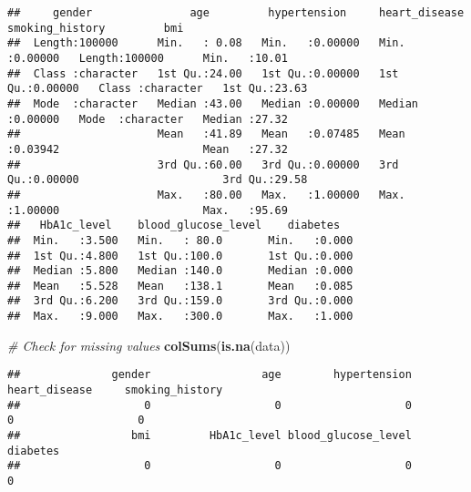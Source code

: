 \documentclass[
]{article}
\newenvironment{Shaded}{\begin{snugshade}}{\end{snugshade}}
\newcommand{\CommentTok}[1]{\textcolor[rgb]{0.56,0.35,0.01}{\textit{#1}}}
\newcommand{\FunctionTok}[1]{\textcolor[rgb]{0.13,0.29,0.53}{\textbf{#1}}}
\newcommand{\NormalTok}[1]{#1}
\begin{document}
\begin{verbatim}
##     gender               age         hypertension     heart_disease     smoking_history         bmi       
##  Length:100000      Min.   : 0.08   Min.   :0.00000   Min.   :0.00000   Length:100000      Min.   :10.01  
##  Class :character   1st Qu.:24.00   1st Qu.:0.00000   1st Qu.:0.00000   Class :character   1st Qu.:23.63  
##  Mode  :character   Median :43.00   Median :0.00000   Median :0.00000   Mode  :character   Median :27.32  
##                     Mean   :41.89   Mean   :0.07485   Mean   :0.03942                      Mean   :27.32  
##                     3rd Qu.:60.00   3rd Qu.:0.00000   3rd Qu.:0.00000                      3rd Qu.:29.58  
##                     Max.   :80.00   Max.   :1.00000   Max.   :1.00000                      Max.   :95.69  
##   HbA1c_level    blood_glucose_level    diabetes    
##  Min.   :3.500   Min.   : 80.0       Min.   :0.000  
##  1st Qu.:4.800   1st Qu.:100.0       1st Qu.:0.000  
##  Median :5.800   Median :140.0       Median :0.000  
##  Mean   :5.528   Mean   :138.1       Mean   :0.085  
##  3rd Qu.:6.200   3rd Qu.:159.0       3rd Qu.:0.000  
##  Max.   :9.000   Max.   :300.0       Max.   :1.000
\end{verbatim}

\begin{Shaded}
\begin{Highlighting}[]
\CommentTok{\# Check for missing values}
\FunctionTok{colSums}\NormalTok{(}\FunctionTok{is.na}\NormalTok{(data))}
\end{Highlighting}
\end{Shaded}

\begin{verbatim}
##              gender                 age        hypertension       heart_disease     smoking_history 
##                   0                   0                   0                   0                   0 
##                 bmi         HbA1c_level blood_glucose_level            diabetes 
##                   0                   0                   0                   0
\end{verbatim}
\end{document}
